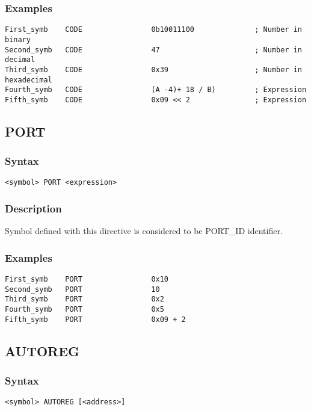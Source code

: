         \subsubsection{Examples}
            \verb'First_symb    CODE                0b10011100              ; Number in binary'\\
            \verb'Second_symb   CODE                47                      ; Number in decimal'\\
            \verb'Third_symb    CODE                0x39                    ; Number in hexadecimal'\\
            \verb'Fourth_symb   CODE                (A -4)+ 18 / B)         ; Expression'\\
            \verb'Fifth_symb    CODE                0x09 << 2               ; Expression'

    \subsection{PORT}
        \subsubsection{Syntax}
            \verb'<symbol> PORT <expression>'

        \subsubsection{Description}
            Symbol defined with this directive is considered to be PORT\_ID identifier.

        \subsubsection{Examples}
            \verb'First_symb    PORT                0x10    '\\
            \verb'Second_symb   PORT                10      '\\
            \verb'Third_symb    PORT                0x2     '\\
            \verb'Fourth_symb   PORT                0x5     '\\
            \verb'Fifth_symb    PORT                0x09 + 2'

    \subsection{AUTOREG}
        \subsubsection{Syntax}
            \verb'<symbol> AUTOREG [<address>]'

